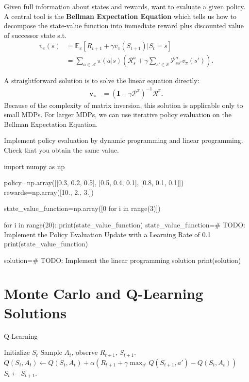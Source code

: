 Given full information about states and rewards, want to evaluate a given policy. A central tool is the \textbf{Bellman Expectation Equation} which tells us how to decompose the state-value function into immediate reward plus discounted value of successor state s.t.
\begin{align*}
    v_{\pi}(s) & = \mathbb{E}_{\pi}[R_{t+1} + \gamma v_{\pi}(S_{t+1}) | S_t = s]\\
    & = \sum_{a \in \mathcal{A}} \pi(a|s) \left( \mathcal{R}_s^a + \gamma \sum_{s' \in \mathcal{S}} \mathcal{P}_{ss'}^a v_{\pi}(s') \right).
\end{align*}

A straightforward solution is to solve the linear equation directly:
\begin{align*}
    \boldsymbol{v}_{\pi} & = (\boldsymbol{I} -  \gamma \boldsymbol{\mathcal{P}}^{\pi})^{-1} \boldsymbol{\mathcal{R}}^{\pi}.
    \end{align*}
Because of the complexity of matrix inversion, this solution is applicable only to small MDPs. For larger MDPs, we can use iterative policy evaluation on the Bellman Expectation Equation.

\begin{exercise}
\label{exercise:PolicyEvaluation}
Implement policy evaluation by dynamic programming and linear programming. Check that you obtain the same value.

\begin{python}
import numpy as np

policy=np.array([[0.3, 0.2, 0.5], [0.5, 0.4, 0.1], [0.8, 0.1, 0.1]])
rewards=np.array([10., 2., 3.])

state_value_function=np.array([0 for i in range(3)])

for i in range(20):
    print(state_value_function)
    state_value_function=# TODO: Implement the Policy Evaluation Update with a Learning Rate of 0.1
print(state_value_function)

solution=# TODO: Implement the linear programming solution
print(solution)
\end{python}
\end{exercise}

\section{Monte Carlo and Q-Learning Solutions}

\begin{algorithm}[t!]
\label{algo:q-learning}
   \caption{Q-Learning}
\begin{algorithmic}[1]
\STATE Initialize $S_t$
\STATE Sample $A_t$, observe $R_{t+1}$, $S_{t+1}$.
\STATE $Q(S_t,A_t) \leftarrow Q(S_t,A_t) + \alpha (R_{t+1} + \gamma \max_{a'} Q(S_{t+1},a') - Q(S_t,A_t))$
\STATE $S_t \leftarrow S_{t+1}$.
\ENDFOR
	\ENDFOR
\end{algorithmic}
\end{algorithm}

